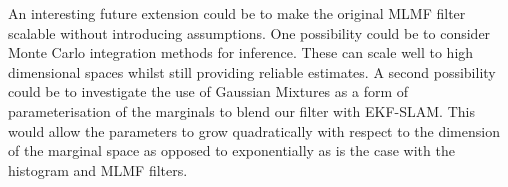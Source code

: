 An interesting future extension could be to make the original MLMF filter scalable without introducing assumptions.
One possibility could be to consider Monte Carlo integration methods for inference. These can scale well to high dimensional 
spaces whilst still providing reliable estimates. A second possibility could be to investigate the use of Gaussian Mixtures as a 
form of parameterisation of the marginals to blend our filter with EKF-SLAM. This would allow the parameters 
to grow quadratically with respect to the dimension of the marginal space as opposed to exponentially as is the case 
with the histogram and MLMF filters.






